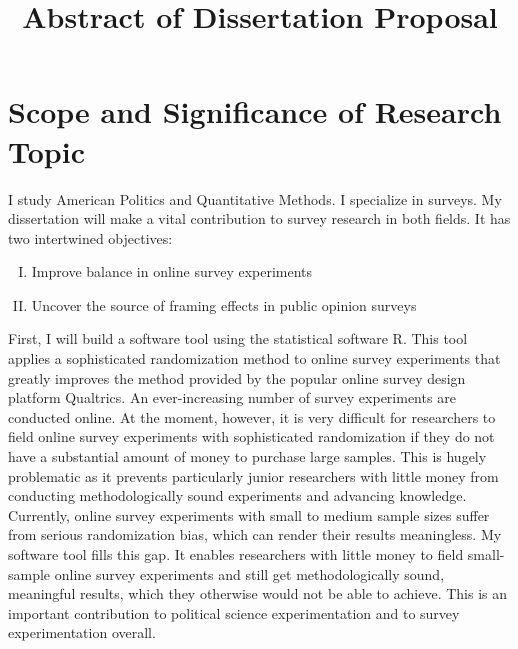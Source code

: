 \documentclass[11pt]{article}
\title{Abstract of Dissertation Proposal}
\date{}
\begin{document}
\maketitle

\vspace{-1.6cm}


\section*{Scope and Significance of Research Topic}

\vspace{0.3cm}
I study American Politics and Quantitative Methods. I specialize in surveys. My dissertation will make a vital contribution to survey research in both fields. It has two intertwined objectives:

\vspace{-0.2cm}

\begin{enumerate}[I.]
	\item Improve balance in online survey experiments
	 \vspace{-0.3cm}
	\item Uncover the source of framing effects in public opinion surveys
\end{enumerate}

\vspace{-0.2cm}

First, I will build a software tool using the statistical software R. This tool applies a sophisticated randomization method to online survey experiments that greatly improves the method provided by the popular online survey design platform Qualtrics. An ever-increasing number of survey experiments are conducted online. At the moment, however, it is very difficult for researchers to field online survey experiments with sophisticated randomization if they do not have a substantial amount of money to purchase large samples. This is hugely problematic as it prevents particularly junior researchers with little money from conducting methodologically sound experiments and advancing knowledge. Currently, online survey experiments with small to medium sample sizes suffer from serious randomization bias, which can render their results meaningless. My software tool fills this gap. It enables researchers with little money to field small-sample online survey experiments and still get methodologically sound, meaningful results, which they otherwise would not be able to achieve. This is an important contribution to political science experimentation and to survey experimentation overall.
\end{document}
